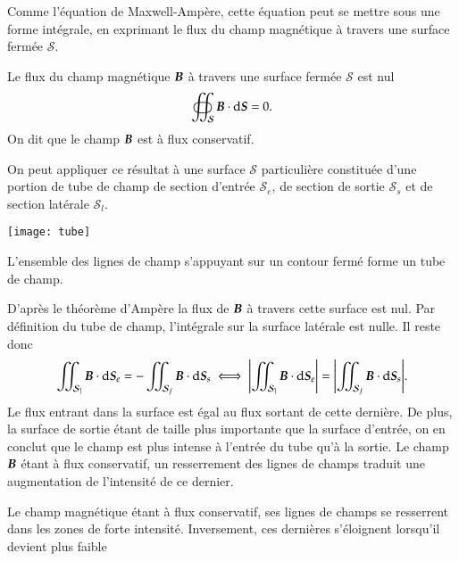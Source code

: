 Comme l'équation de Maxwell-Ampère, cette équation peut se mettre sous une forme
intégrale, en exprimant le flux du champ magnétique à travers une surface fermée
$\mathcal{S}$.

\begin{defn}
	Le flux du champ magnétique $\vecb$ à travers une surface fermée 
	$\mathcal{S}$ est nul
	\begin{equation*}
		\oiint_\mathcal{S} \vecb \cdot \ds = 0.
	\end{equation*}
	On dit que le champ $\vecb$ est à flux conservatif.
\end{defn}

	\begin{minipage}{0.6\linewidth}
	On peut appliquer ce résultat à une surface $\mathcal{S}$ particulière
	constituée d'une portion de tube de champ de section d'entrée $\mathcal{S}_e$,
	de section de sortie $\mathcal{S}_s$ et de section latérale $
	\mathcal{S}_l$. 	
	\end{minipage}
	\hfill
	\begin{minipage}{0.3\linewidth}
	\texttt{[image: tube]}
	\end{minipage}
	\vspace{0.5cm}

\begin{defn}
	L'ensemble des lignes de champ s'appuyant sur un contour fermé forme un 
	tube de champ.
\end{defn}
	
	D'après le théorème d'Ampère la flux de $\vecb$ à
	travers cette surface est nul.
	Par définition du tube de champ, l'intégrale sur la surface 
	latérale est nulle. Il reste donc 
	\begin{equation*}
		\iint_\mathcal{S_e} \vecb \cdot \ds_e =
		- \iint_\mathcal{S_s} \vecb \cdot \ds_s 
		\iff
		\displaystyle{\left\lvert\iint_\mathcal{S_e} \vecb \cdot \ds_e\right\rvert =
		\left\lvert\iint_\mathcal{S_s} \vecb \cdot \ds_s\right\rvert}.
	\end{equation*}
	Le flux entrant dans la surface est égal au flux sortant de cette dernière.
	De plus, la surface de sortie étant de taille plus importante que 
	la surface d'entrée, on en conclut que le champ est plus intense
	à l'entrée du tube qu'à la sortie. Le champ $\vecb$ étant à flux
	conservatif, un resserrement des lignes de champs traduit une augmentation
	de l'intensité de ce dernier.

\begin{defn}
	Le champ magnétique étant à flux conservatif, ses lignes de champs
	se resserrent dans les zones de forte intensité. Inversement, ces dernières
	s'éloignent lorsqu'il devient plus faible
\end{defn}

